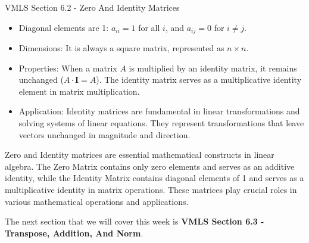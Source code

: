 \begin{notes}{VMLS Section 6.2 - Zero And Identity Matrices}
    \begin{itemize}
        \item Diagonal elements are 1: $a_{ii} = 1$ for all $i$, and $a_{ij} = 0$ for $i \neq j$.

        \item Dimensions: It is always a square matrix, represented as $n \times n$.

        \item Properties: When a matrix $A$ is multiplied by an identity matrix, it remains unchanged ($A \cdot \mathbf{I} = A$). The identity matrix serves as a multiplicative identity element in 
        matrix multiplication.

        \item Application: Identity matrices are fundamental in linear transformations and solving systems of linear equations. They represent transformations that leave vectors unchanged in magnitude 
        and direction.
    \end{itemize}

    Zero and Identity matrices are essential mathematical constructs in linear algebra. The Zero Matrix contains only zero elements and serves as an additive identity, while the Identity Matrix contains 
    diagonal elements of 1 and serves as a multiplicative identity in matrix operations. These matrices play crucial roles in various mathematical operations and applications.
\end{notes}

The next section that we will cover this week is \textbf{VMLS Section 6.3 - Transpose, Addition, And Norm}.

